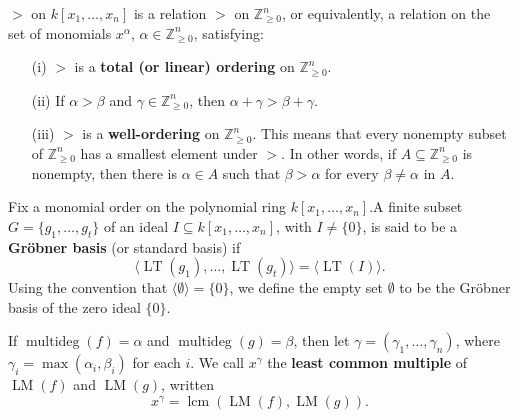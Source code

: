 \begin{definition}\label{monomial order}
  \leanok
  \( > \) on \( k[x_1, \ldots, x_n] \) is a relation \( > \) on \( \mathbb{Z}_{\geq 0}^n \), or equivalently, a relation on the set of monomials \( x^\alpha \), \( \alpha \in \mathbb{Z}_{\geq 0}^n \), satisfying:

  \begin{enumerate}
      \item[(i)] \( > \) is a \textbf{total (or linear) ordering} on \( \mathbb{Z}_{\geq 0}^n \).

      \item[(ii)] If \( \alpha > \beta \) and \( \gamma \in \mathbb{Z}_{\geq 0}^n \), then \( \alpha + \gamma > \beta + \gamma \).

      \item[(iii)] \( > \) is a \textbf{well-ordering} on \( \mathbb{Z}_{\geq 0}^n \). This means that every nonempty subset of \( \mathbb{Z}_{\geq 0}^n \) has a smallest element under \( > \). In other words, if \( A \subseteq \mathbb{Z}_{\geq 0}^n \) is nonempty, then there is \( \alpha \in A \) such that \( \beta > \alpha \) for every \( \beta \neq \alpha \) in \( A \).
  \end{enumerate}
\end{definition}

\begin{definition}\label{Gröbner Basis}
  \leanok
  Fix a monomial order on the polynomial ring $k[x_1, \ldots, x_n]$.A finite subset $G = \{g_1, \ldots, g_t\}$ of an ideal $I \subseteq k[x_1, \ldots, x_n]$, with $I \ne \{0\}$, is said to be a \textbf{Gröbner basis} (or standard basis) if
  \[
  \langle \operatorname{LT}(g_1), \ldots, \operatorname{LT}(g_t) \rangle = \langle \operatorname{LT}(I) \rangle.
  \]
  Using the convention that $\langle \emptyset \rangle = \{0\}$, we define the empty set $\emptyset$ to be the Gröbner basis of the zero ideal $\{0\}$.
\end{definition}

\begin{definition}\label{LCM}
  If $\operatorname{multideg}(f) = \alpha$ and $\operatorname{multideg}(g) = \beta$, then let $\gamma = (\gamma_1, \ldots, \gamma_n)$, where $\gamma_i = \max(\alpha_i, \beta_i)$ for each $i$. We call $x^\gamma$ the \textbf{least common multiple} of $\operatorname{LM}(f)$ and $\operatorname{LM}(g)$, written
  \[
  x^\gamma = \operatorname{lcm}(\operatorname{LM}(f), \operatorname{LM}(g)).
  \]
\end{definition}

